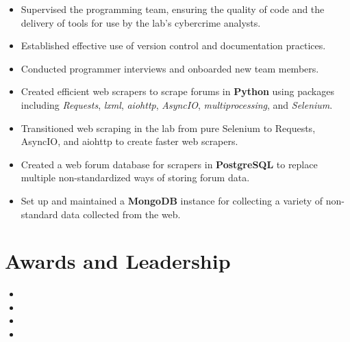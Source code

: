 \documentclass[10pt]{setzerresume}
\begin{document}
  \begin{itemize}[nosep]%

    \item Supervised the programming team, ensuring the quality of code and the delivery of tools for use by the lab's cybercrime analysts.
    \item Established effective use of version control and documentation practices.
    \item Conducted programmer interviews and onboarded new team members.
    \item Created efficient web scrapers to scrape forums in \textbf{Python} using packages including \textit{Requests}, \textit{lxml}, \textit{aiohttp}, \textit{AsyncIO}, \textit{multiprocessing}, and \textit{Selenium}.
    \item Transitioned web scraping in the lab from pure Selenium to Requests, AsyncIO, and aiohttp to create faster web scrapers.
    \item Created a web forum database for scrapers in \textbf{PostgreSQL} to replace multiple non-standardized ways of storing forum data.
    \item Set up and maintained a \textbf{MongoDB} instance for collecting a variety of non-standard data collected from the web.
          
  \end{itemize}






  \section{Awards and Leadership}

  \begin{itemize}
    \item {}
    \item {}
    \item {} %
    \item {}
  \end{itemize}

\end{document}
